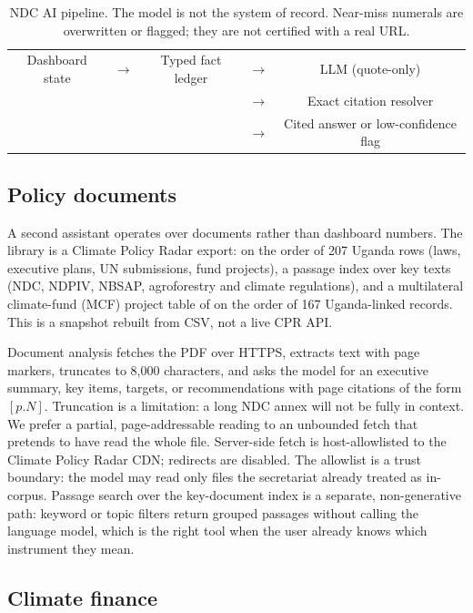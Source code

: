\documentclass{article}
\begin{document}
\begin{table}[t]
  \caption{NDC AI pipeline. The model is not the system of record. Near-miss numerals are overwritten or flagged; they are not certified with a real URL.}
  \label{fig:ai-pipeline}
  \centering
  \small
  \begin{tabular}{ccccc}
    \toprule
    Dashboard state & $\rightarrow$ & Typed fact ledger & $\rightarrow$ & LLM (quote-only) \\
     & & & $\rightarrow$ & Exact citation resolver \\
     & & & $\rightarrow$ & Cited answer or low-confidence flag \\
    \bottomrule
  \end{tabular}
\end{table}

\subsection{Policy documents}
\label{sec:documents}

A second assistant operates over documents rather than dashboard numbers. The library is a Climate Policy Radar export: on the order of 207 Uganda rows (laws, executive plans, UN submissions, fund projects), a passage index over key texts (NDC, NDPIV, NBSAP, agroforestry and climate regulations), and a multilateral climate-fund (MCF) project table of on the order of 167 Uganda-linked records. This is a snapshot rebuilt from CSV, not a live CPR API.

Document analysis fetches the PDF over HTTPS, extracts text with page markers, truncates to 8{,}000 characters, and asks the model for an executive summary, key items, targets, or recommendations with page citations of the form $[p.N]$. Truncation is a limitation: a long NDC annex will not be fully in context. We prefer a partial, page-addressable reading to an unbounded fetch that pretends to have read the whole file. Server-side fetch is host-allowlisted to the Climate Policy Radar CDN; redirects are disabled. The allowlist is a trust boundary: the model may read only files the secretariat already treated as in-corpus. Passage search over the key-document index is a separate, non-generative path: keyword or topic filters return grouped passages without calling the language model, which is the right tool when the user already knows which instrument they mean.

\subsection{Climate finance}
\label{sec:finance}
\end{document}
